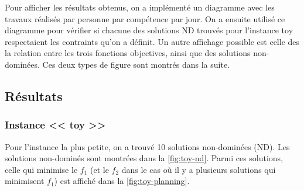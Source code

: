 \documentclass[12pt, a4paper, french, version=last, parskip=half, titlepage]{scrartcl}
\begin{document}
Pour afficher les résultats obtenus, on a implémenté un diagramme avec les travaux réalisés par personne par compétence par jour. On a ensuite utilisé ce diagramme pour vérifier si chacune des solutions ND trouvés pour l'instance toy respectaient les contraints qu'on a définit. Un autre affichage possible est celle des la relation entre les trois fonctions objectives, ainsi que des solutions non-dominées. Ces deux types de figure sont montrés dans la suite.

\subsection{Résultats}

\subsubsection{Instance << toy >>}

Pour l'instance la plus petite, on a trouvé 10 solutions non-dominées (ND). Les solutions non-dominés sont montrées dans la \cref{fig:toy-nd}. Parmi ces solutions, celle qui minimise le $f_1$ (et le $f_2$ dans le cas où il y a plusieurs solutions qui minimisent $f_1$) est affiché dans la \cref{fig:toy-planning}.
\end{document}
